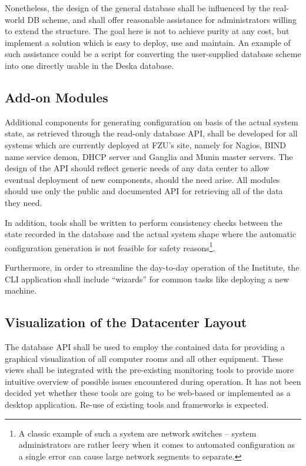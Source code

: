 \documentclass{article}
\begin{document}
Nonetheless, the design of the general database shall be influenced by the real-world DB scheme, and shall offer reasonable
assistance for administrators willing to extend the structure.  The goal here is not to achieve purity at any cost, but implement
a solution which is easy to deploy, use and maintain. An example of such assistance could be a script for converting the
user-supplied database scheme into one directly usable in the Deska database. 

\subsection{Add-on Modules}

Additional components for generating configuration on basis of the actual system state, as retrieved through the read-only
database API, shall be developed for all systems which are currently deployed at FZU's site, namely for Nagios, BIND name service
demon, DHCP server and Ganglia and Munin master servers.  The design of the API should reflect generic needs of any data center to
allow eventual deployment of new components, should the need arise.  All modules should use only the public and documented API for
retrieving all of the data they need.

In addition, tools shall be written to perform consistency checks between the state recorded in the database and the actual system
shape where the automatic configuration generation is not feasible for safety reasons\footnote{A classic example of such a system
are network switches -- system administrators are rather leery when it comes to automated configuration as a single error can
cause large network segments to separate.}.

Furthermore, in order to streamline the day-to-day operation of the Institute, the CLI application shall include ``wizards'' for
common tasks like deploying a new machine.

\subsection{Visualization of the Datacenter Layout}

The database API shall be used to employ the contained data for providing a graphical visualization of all computer rooms and all
other equipment.  These views shall be integrated with the pre-existing monitoring tools to provide more intuitive overview of
possible issues encountered during operation.  It has not been decided yet whether these tools are going to be web-based or
implemented as a desktop application.  Re-use of existing tools and frameworks is expected.
\end{document}
